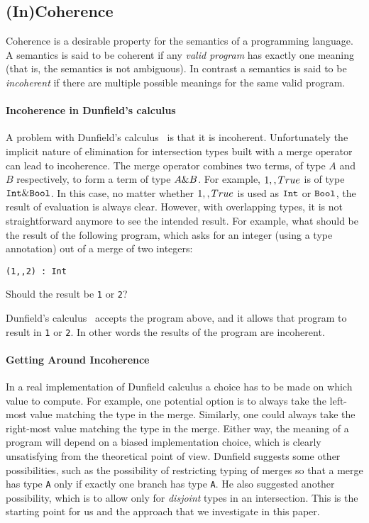 \subsection{(In)Coherence} \label{subsec:incoherence}

Coherence is a desirable property for the semantics of a programming
language. A semantics is said to be coherent if any \emph{valid
  program} has exactly one meaning~\cite{reynolds1991coherence} (that
is, the semantics is not ambiguous). In contrast a semantics is said
to be \emph{incoherent} if there are multiple possible meanings for
the same valid program. 

\paragraph{Incoherence in Dunfield's calculus}
A problem with Dunfield's calculus~\cite{dunfield2014elaborating} is
that it is incoherent.  Unfortunately the implicit nature of
elimination for intersection types built with a merge operator can
lead to incoherence.  The merge operator combines two terms, of type
$A$ and $B$ respectively, to form a term of type $A \& B$. For
example, $1 ,, True$ is of type $\texttt{Int} \&
\texttt{Bool}$. In this case, no matter whether $1 ,, True$ is used as
$\texttt{Int}$ or $\texttt{Bool}$, the result of evaluation is always
clear. However, with overlapping types, it is not straightforward
anymore to see the intended result. For example, what should be the result of
the following program, which asks for an integer (using a type annotation) out
of a merge of two integers:
\begin{lstlisting}
(1,,2) : Int
\end{lstlisting}
Should the result be \lstinline$1$ or \lstinline$2$?

Dunfield's calculus~\cite{dunfield2014elaborating} accepts the program
above, and it allows that program to result in \lstinline$1$ or \lstinline$2$.
In other words the results of the program are incoherent.

\paragraph{Getting Around Incoherence}
In a real implementation of Dunfield calculus a choice has to be made
on which value to compute. For example, one potential option is to
always take the left-most value matching the type in the
merge. Similarly, one could always take the right-most value matching
the type in the merge. Either way, the meaning of a program will
depend on a biased implementation choice, which is clearly
unsatisfying from the theoretical point of view.  Dunfield suggests
some other possibilities, such as the possibility of restricting typing
of merges so that a merge has type \lstinline$A$ only if exactly one
branch has type \lstinline$A$. He also suggested another possibility,
which is to allow only for \emph{disjoint} types in an intersection.
This is the starting point for us and the approach that we 
investigate in this paper. 

